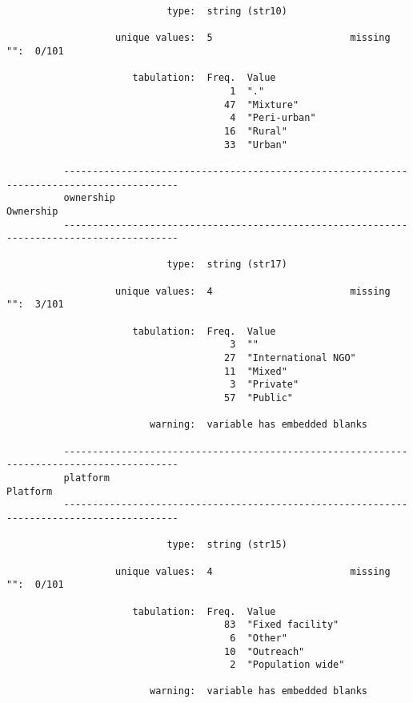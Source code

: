 \documentclass{article}
\begin{document}
\begin{verbatim}
                            type:  string (str10)
          
                   unique values:  5                        missing "":  0/101
          
                      tabulation:  Freq.  Value
                                       1  "."
                                      47  "Mixture"
                                       4  "Peri-urban"
                                      16  "Rural"
                                      33  "Urban"
          
          ------------------------------------------------------------------------------------------
          ownership                                                                        Ownership
          ------------------------------------------------------------------------------------------
          
                            type:  string (str17)
          
                   unique values:  4                        missing "":  3/101
          
                      tabulation:  Freq.  Value
                                       3  ""
                                      27  "International NGO"
                                      11  "Mixed"
                                       3  "Private"
                                      57  "Public"
          
                         warning:  variable has embedded blanks
          
          ------------------------------------------------------------------------------------------
          platform                                                                          Platform
          ------------------------------------------------------------------------------------------
          
                            type:  string (str15)
          
                   unique values:  4                        missing "":  0/101
          
                      tabulation:  Freq.  Value
                                      83  "Fixed facility"
                                       6  "Other"
                                      10  "Outreach"
                                       2  "Population wide"
          
                         warning:  variable has embedded blanks
          

\end{verbatim}
\end{document}
